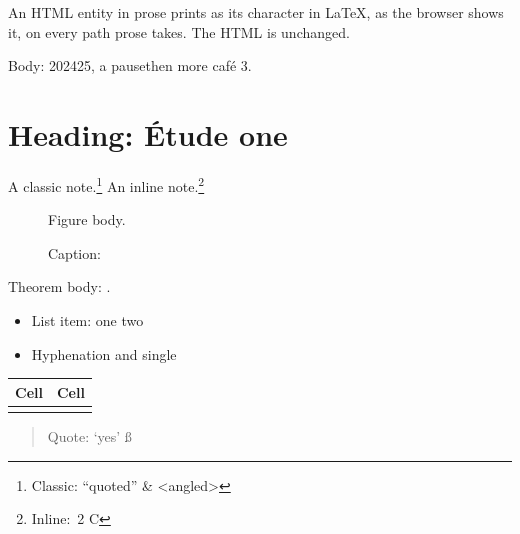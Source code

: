 An HTML entity in prose prints as its character in LaTeX, as the browser
shows it, on every path prose takes. The HTML is unchanged.

Body: 2024\textendash{}25, a pause\textemdash{}then more\textellipsis{} café \textcopyright{} \textsection{}\nobreakspace{}3.

\section{Heading: Étude \textparagraph{} one}

A classic note.\footnote{Classic: \textquotedblleft{}quoted\textquotedblright{} \& \textless{}angled\textgreater{}} An inline note.\footnote{Inline: \textpm{}\,2 \textdegree{}C}

\begin{figure}[htbp]
\centering
Figure body.

\caption{Caption: \textonehalf{} \texttimes{} \textthreequarters{}}
\label{fig:entities}
\end{figure}

\begin{theorem}
Theorem body: \textrightarrow{} \textleftarrow{}.
\end{theorem}

\begin{itemize}
\item List item: \textbullet{} one \textperiodcentered{} two
\item Hyphen\-ation and \textquotesingle{}single\textquotesingle{}
\end{itemize}

\begin{tabular}{ll}
\toprule
Cell \texteuro{} & Cell \textsterling{} \\
\midrule
\textyen{} & \textcent{} \\
\bottomrule
\end{tabular}

\begin{quote}
Quote: \textquoteleft{}yes\textquoteright{} \ss{}
\end{quote}

